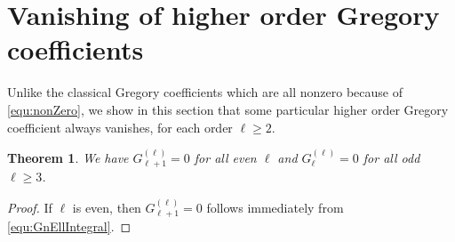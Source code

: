 \documentclass[11pt]{article}
\theoremstyle{plain}
\newtheorem{thm}{Theorem}[section]
\theoremstyle{definition}
\begin{document}
\section{Vanishing of higher order Gregory coefficients}
Unlike the classical Gregory coefficients which are all nonzero because of \eqref{equ:nonZero}, we show in this section that
some particular higher order Gregory coefficient always vanishes, for each order $\ell\ge 2$.

\begin{thm}\label{thm:vanishing}
We have  $G_{\ell+1}^{(\ell)}=0$ for all even  $\ell$ and $G_{\ell}^{(\ell)}=0$ for all odd $\ell\ge 3$.
\end{thm}

\begin{proof}
If $\ell$ is even, then $G_{\ell+1}^{(\ell)}=0$ follows immediately from \eqref{equ:GnEllIntegral}.


\end{proof}
\end{document}
